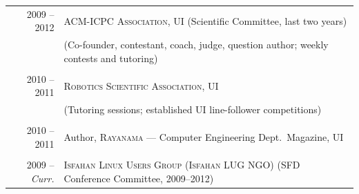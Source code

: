 \begin{tabular}{rl}
  \textsc{2009 -- 2012} &
  \textsc{ACM-ICPC Association}, UI \small (Scientific Committee, last two years) \\
  & \footnotesize (Co-founder, contestant, coach, judge, question author; weekly contests and tutoring)
  \\ \vspace{-2mm} \\

  \textsc{2010 -- 2011} &
  \textsc{Robotics Scientific Association}, UI \\
  & \footnotesize (Tutoring sessions; established UI line-follower competitions)
  \\ \vspace{-2mm} \\

  \textsc{2010 -- 2011} &
  Author, \textsc{Rayanama} — Computer Engineering Dept.\ Magazine, UI
  \\ \vspace{-2mm} \\

  \textsc{2009} -- \emph{Curr.} &
  \textsc{Isfahan Linux Users Group (Isfahan LUG NGO)}
  \small (SFD Conference Committee, 2009--2012)

\end{tabular}

